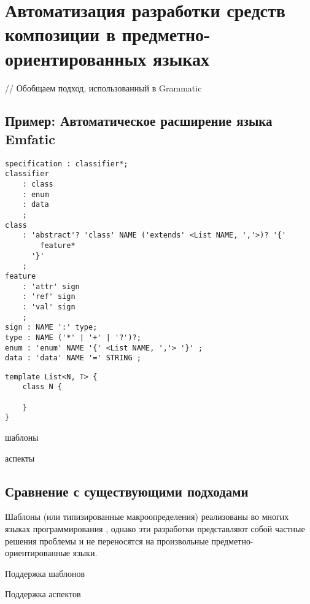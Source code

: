 \part{Автоматизация разработки средств композиции в предметно-ориентированных языках}\label{part4}

// Обобщаем подход, использованный в Grammatic





\chapter{Пример: Автоматическое расширение языка Emfatic}

\begin{lstlisting}
specification : classifier*;
classifier
	: class
	: enum
	: data
	;
class
	: 'abstract'? 'class' NAME ('extends' <List NAME, ','>)? '{'
		feature*
	  '}'
	;
feature
	: 'attr' sign
	: 'ref' sign
	: 'val' sign
	;
sign : NAME ':' type;
type : NAME ('*' | '+' | '?')?;
enum : 'enum' NAME '{' <List NAME, ','> '}' ;
data : 'data' NAME '=' STRING ;
\end{lstlisting}

\begin{lstlisting}
template List<N, T> {
	class N {
		
	}
}

\end{lstlisting}

шаблоны

аспекты

\chapter{Сравнение с существующими подходами}

Шаблоны (или типизированные макроопределения) реализованы во многих языках программирования \cite{???}, однако эти разработки представляют собой частные решения проблемы и не переносятся на произвольные предметно-ориентированные языки.

\begin{table}[htb]
	\centering
\newcommand{\dissonly}[1]{#1}

	\caption{Поддержка шаблонов}\label{TmpTable}
\end{table}


\begin{table}[htb]
	\centering
\newcommand{\dissonly}[1]{#1}

	\caption{Поддержка аспектов}\label{AspTable}
\end{table}

